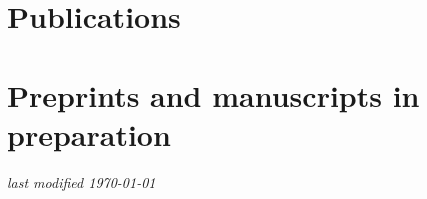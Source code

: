 \documentclass[11pt]{article}
\makeatletter
\let\saved@bibitem\@bibitem
\makeatother
\begin{document}
  \begingroup
    \makeatletter
    \let\@bibitem\saved@bibitem
  \endgroup



\section{Publications}

{ \setlength{\parskip}{2ex}


}

\section{Preprints and manuscripts in preparation}

{ \setlength{\parskip}{2ex}

}



\begin{center} 
\vspace{\fill}
\small \it last modified \today
\end{center}
\end{document}
